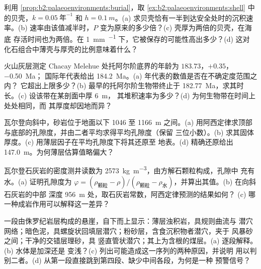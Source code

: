 \begin{exercise}[$\star\star$]\label{exo:b2:palaeoenvironments:5}
利用 \cref{prop:b2:palaeoenvironments:burial}，取
\cref{ex:b2:palaeoenvironments:shell} 中的贝壳，$k = \qty{0.05}{\text{年}^{-1}}$ 和 $h = \qty{0.1}{m}$。(a)
求贝壳恰有一半到达安全处时的沉积速率。(b) 速率由该值减半时，$P$
变为原来的多少倍？(c) 壳厚为两倍的贝壳，在海底
存活时间也为两倍。在 \qty{1}{mm.^{-1}} 下，它被保存的可能性高出多少？(d) 这对
化石组合中薄壳与厚壳的比例意味着什么？
\end{exercise}

\begin{exercise}[$\star\star$]\label{exo:b2:palaeoenvironments:6}
火山灰层测定 Chacay Melehue 处托阿尔阶底界的年龄为 $183.73$，$+0.35$，\qty{-0.50}{Ma}；
国际年代表给出 \qty{184.2}{Ma}。(a) 年代表的数值是否在不确定度范围之内？
它超出上限多少？(b) 最早的托阿尔阶生物带终止于
\qty{182.77}{Ma}，求其时长。(c) 设该带在某剖面中厚 \qty{6}{m}，
其堆积速率为多少？(d) 为何生物带在时间上处处相同，而
其厚度却因地而异？
\end{exercise}

\begin{exercise}[$\star\star$]\label{exo:b2:palaeoenvironments:7}
瓦尔登向斜中，砂岩位于地面以下 1046 至 \qty{1166}{m} 之间。(a)
用阿西定律求顶部与底部的孔隙度，并由二者平均求得平均孔隙度（保留
三位小数）。(b) 求其固体厚度。(c) 用薄层因子在平均孔隙度下将其还原至
地表。(d) 精确还原给出
\qty{147.0}{m}。为何薄层估算值略偏大？
\end{exercise}

\begin{exercise}[$\star\star$]\label{exo:b2:palaeoenvironments:8}
瓦尔登石灰岩的密度测井读数为 \qty{2573}{kg.m^{-3}}，由方解石颗粒构成，孔隙中
充有水。(a) 证明孔隙度为 $\varphi = (\rho_{\text{颗粒}} -
\rho)/(\rho_{\text{颗粒}} - \rho_{\text{水}})$，并算出其值。(b) 在向斜石灰岩的中部
深度 \qty{956}{m} 处，取石灰岩常数，阿西定律预测的结果如何？
(c) 哪一种成岩作用可以解释这一差异？
\end{exercise}

\begin{exercise}[$\star\star$]\label{exo:b2:palaeoenvironments:9}
一段由侏罗纪岩层构成的悬崖，自下而上显示：薄层浊积岩，具规则曲流与
潜穴网络；暗色泥，具螺旋状回填层潜穴；粉砂层，含食沉积物者潜穴，夹于
风暴砂之间；干净的交错层理砂，具
竖直管状潜穴；其上为含根的煤层。(a) 逐段解释。(b) 水体是加深还是
变浅？(c) 列出可能造成这一序列的两种原因，并说明
用以判别二者。(d) 从第一段直接跳到第四段、缺少中间各段，为何是一种
预警信号？
\end{exercise}

